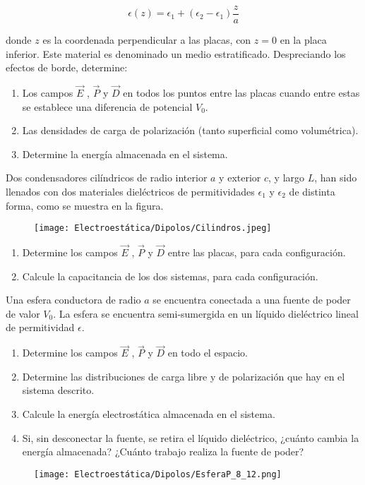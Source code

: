 \[\epsilon(z) = \epsilon_1 + (\epsilon_2-\epsilon_1)\frac{z}{a}\]

donde $z$ es la coordenada perpendicular a las placas, con $z=0$ en la placa inferior. Este material es denominado un medio estratificado. Despreciando los efectos de borde, determine:

\begin{enumerate}[label=\alph*)]
    \item Los campos $\Vec{E}$ , $\Vec{P}$ y $\Vec{D}$ en todos los puntos entre las placas cuando entre estas se establece una diferencia de potencial $V_0$.
    \item Las densidades de carga de polarización (tanto superficial como volumétrica).
    \item Determine la energía almacenada en el sistema.
\end{enumerate}
\bigbreak
\np

Dos condensadores cilíndricos de radio interior $a$ y exterior $c$, y largo $L$, han sido llenados con dos materiales dieléctricos de permitividades $\epsilon_1$ y $\epsilon_2$ de distinta forma, como se muestra en la figura.

\begin{figure}[H]
    \centering
    \texttt{[image: Electroestática/Dipolos/Cilindros.jpeg]}
\end{figure}

\begin{enumerate}[label=\alph*)]
    \item Determine los campos $\Vec{E}$ , $\Vec{P}$ y $\Vec{D}$ entre las placas, para cada configuración.
    \item Calcule la capacitancia de los dos sistemas, para cada configuración.
\end{enumerate}
\bigbreak

\np
Una esfera conductora de radio $a$ se encuentra conectada a una fuente de poder de valor $V_0$. La esfera se encuentra semi-sumergida en un líquido dieléctrico lineal de permitividad $\epsilon$.

\begin{enumerate}[label=\alph*)]
    \item Determine los campos $\Vec{E}$ , $\Vec{P}$ y $\Vec{D}$ en todo el espacio.
    \item Determine las distribuciones de carga libre y de polarización que hay en el sistema descrito.
    \item Calcule la energía electrostática almacenada en el sistema.
    \item Si, sin desconectar la fuente, se retira el líquido dieléctrico, ¿cuánto cambia la energía almacenada? ¿Cuánto trabajo realiza la fuente de poder?
\end{enumerate}

\begin{figure}[H]
    \centering
    \texttt{[image: Electroestática/Dipolos/EsferaP\_8\_12.png]}
\end{figure}

\newpage